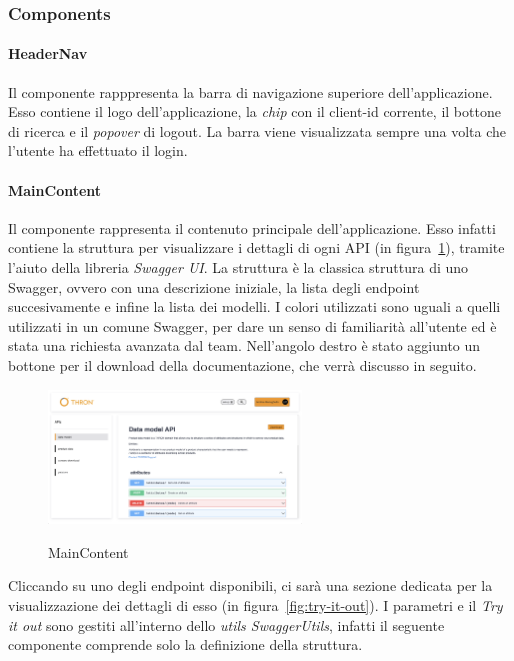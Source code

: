 \subsubsection{Components}\label{subsubsec:components}

\paragraph{HeaderNav}\label{par:header-nav}
Il componente rapppresenta la barra di navigazione superiore dell'applicazione. Esso contiene il logo dell'applicazione, la \textit{chip} con il client-id
corrente, il bottone di ricerca e il \textit{popover} di logout. 
La barra viene visualizzata sempre una volta che l'utente ha effettuato il login.\\

\paragraph{MainContent}\label{par:main-content}
Il componente rappresenta il contenuto principale dell'applicazione. Esso infatti contiene la struttura per visualizzare i dettagli di ogni API (in figura~\ref{fig:main-content}), tramite l'aiuto 
della libreria \textit{Swagger UI}.
La struttura è la classica struttura di uno Swagger, ovvero con una descrizione iniziale, la lista degli endpoint succesivamente e infine la lista dei modelli.
I colori utilizzati sono uguali a quelli utilizzati in un comune Swagger, per dare un senso di familiarità all'utente ed è stata una richiesta avanzata dal team.
Nell'angolo destro è stato aggiunto un bottone per il download della documentazione, che verrà discusso in seguito.
\begin{figure}[ht]
  \centering
  \includegraphics[width=0.6\textwidth, alt={Sezione per la visualizzazione dei dettagli di un API}]{images/frontend/DataModelView.jpg}
  \caption{MainContent}\label{fig:main-content}
\end{figure}
Cliccando su uno degli endpoint disponibili, ci sarà una sezione dedicata per la visualizzazione dei dettagli di esso (in figura~\ref{fig:try-it-out}).
I parametri e il \textit{Try it out} sono gestiti all'interno dello \textit{utils SwaggerUtils}, infatti il seguente componente comprende solo la definizione
della struttura.

